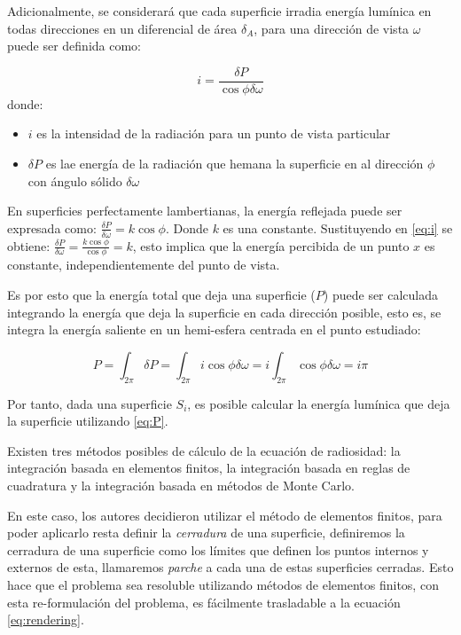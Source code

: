 Adicionalmente, se considerará que cada superficie irradia energía lumínica en todas direcciones en un diferencial de área $\delta_{A}$, para una dirección de vista $\omega$ puede ser definida como:

\begin{equation}
    i = \frac{\delta{P}}{\cos{\phi\delta\omega}} \label{eq:i}
\end{equation}
donde:
\begin{itemize}
    \item $i$ es la intensidad de la radiación para un punto de vista particular
    \item $\delta{P}$ es lae energía de la radiación que hemana la superficie en al dirección $\phi$ con ángulo sólido $\delta\omega$
\end{itemize}

En superficies perfectamente lambertianas, la energía reflejada puede ser expresada como: $\frac{\delta{P}}{\delta{\omega}} = k\cos{\phi}$. Donde $k$ es una constante.
Sustituyendo en \eqref{eq:i} se obtiene: $\frac{\delta{P}}{\delta{\omega}} = \frac{k\cos{\phi}}{\cos{\phi}} = k$, esto implica que la energía percibida de un punto $x$ 
es constante, independientemente del punto de vista.

Es por esto que la energía total que deja una superficie ($P$) puede ser calculada integrando la energía que deja la superficie en cada dirección posible, esto es, se integra la energía saliente en un hemi-esfera centrada en el punto estudiado:

\begin{equation}
    P = \int_{2\pi} \delta{P} = \int_{2\pi} i\cos{\phi}\delta{\omega} = i \int_{2\pi} \cos{\phi}\delta{\omega} = i\pi
    \label{eq:P}
\end{equation}

Por tanto, dada una superficie $S_{i}$, es posible calcular la energía lumínica que deja la superficie utilizando \eqref{eq:P}.

Existen tres métodos posibles de cálculo de la ecuación de radiosidad: la integración basada en elementos finitos, la integración basada en reglas de cuadratura y la integración basada en métodos de Monte Carlo.

En este caso, los autores decidieron utilizar el método de elementos finitos, para poder aplicarlo resta definir la \textit{cerradura} de una superficie, definiremos la cerradura de una superficie como los límites que definen los puntos internos y externos de esta, llamaremos \textit{parche} a cada una de estas superficies cerradas. Esto hace que el problema sea resoluble utilizando métodos de elementos finitos, con esta re-formulación del problema, es fácilmente trasladable a la ecuación \eqref{eq:rendering}.


